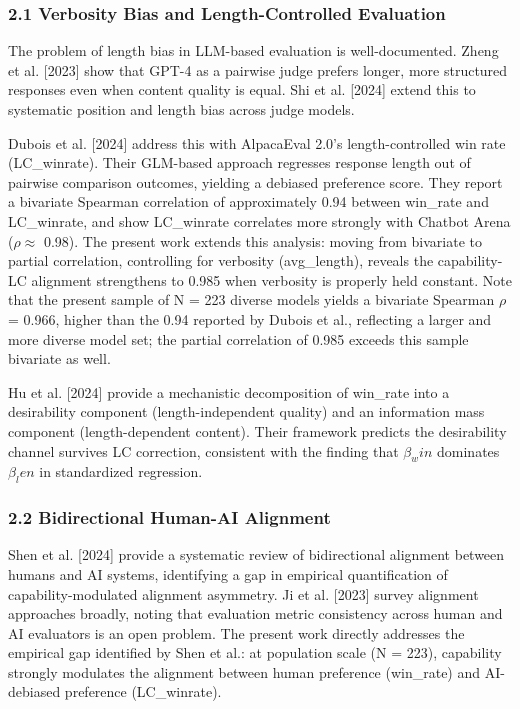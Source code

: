 
\subsubsection{2.1 Verbosity Bias and Length-Controlled Evaluation}

The problem of length bias in LLM-based evaluation is well-documented. Zheng et al. [2023] show that GPT-4 as a pairwise judge prefers longer, more structured responses even when content quality is equal. Shi et al. [2024] extend this to systematic position and length bias across judge models.

Dubois et al. [2024] address this with AlpacaEval 2.0's length-controlled win rate (LC\_winrate). Their GLM-based approach regresses response length out of pairwise comparison outcomes, yielding a debiased preference score. They report a bivariate Spearman correlation of approximately 0.94 between win\_rate and LC\_winrate, and show LC\_winrate correlates more strongly with Chatbot Arena ($\rho \approx$ 0.98). The present work extends this analysis: moving from bivariate to partial correlation, controlling for verbosity (avg\_length), reveals the capability-LC alignment strengthens to 0.985 when verbosity is properly held constant. Note that the present sample of N = 223 diverse models yields a bivariate Spearman $\rho$ = 0.966, higher than the 0.94 reported by Dubois et al., reflecting a larger and more diverse model set; the partial correlation of 0.985 exceeds this sample bivariate as well.

Hu et al. [2024] provide a mechanistic decomposition of win\_rate into a desirability component (length-independent quality) and an information mass component (length-dependent content). Their framework predicts the desirability channel survives LC correction, consistent with the finding that $\beta _win$ dominates $\beta _len$ in standardized regression.

\subsubsection{2.2 Bidirectional Human-AI Alignment}

Shen et al. [2024] provide a systematic review of bidirectional alignment between humans and AI systems, identifying a gap in empirical quantification of capability-modulated alignment asymmetry. Ji et al. [2023] survey alignment approaches broadly, noting that evaluation metric consistency across human and AI evaluators is an open problem. The present work directly addresses the empirical gap identified by Shen et al.: at population scale (N = 223), capability strongly modulates the alignment between human preference (win\_rate) and AI-debiased preference (LC\_winrate).

